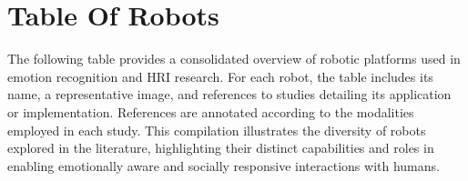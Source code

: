 \section{Table Of Robots}
The following table provides a consolidated overview of robotic platforms used in emotion recognition and HRI research. For each robot, the table includes its name, a representative image, and references to studies detailing its application or implementation. References are annotated according to the modalities employed in each study. This compilation illustrates the diversity of robots explored in the literature, highlighting their distinct capabilities and roles in enabling emotionally aware and socially responsive interactions with humans.
\begin{table}[h]
\centering{}
\caption{Table of all Robots in Literature}
\hspace*{-1in}
\end{table}
